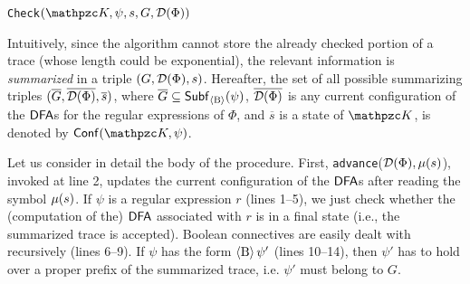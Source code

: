 \begin{algorithm}[tp]
    \caption{\texttt{Check}$(\Ku,\psi,s,G,\Du(\Phi))$}\label{Check}
    \begin{algorithmic}[1]
                \Return{$\top$}
            \Else
                \Return{$\bot$}
            \EndIf
                \Return{$\top$}
            \Else
                \Return{$\bot$}
            \EndIf
                    \Return{$\top$}
                \EndIf
            \EndFor
            \Return{$\bot$}
        \EndIf
    \end{algorithmic}
\end{algorithm}

Intuitively, since the algorithm cannot store the already checked portion of a
trace (whose length could be exponential), the relevant information is \emph{summarized} in a triple $(G,\mathcal{D}(\Phi),s)$. 
Hereafter, the set of all possible summarizing triples $(\overline{G},\overline{\mathcal{D}(\Phi)},\overline{s})$, where $\overline{G}\subseteq\mathsf{Subf}_{\operatorname{\langle B\rangle}}(\psi)$, $\overline{\mathcal{D}(\Phi)}$ is any current configuration of the $\text{\sffamily DFA}$s for the regular expressions of $\Phi$, and $\overline{s}$ is a state of $\Ku$, is denoted 
by $\conf(\Ku,\psi)$.

Let us consider in detail the body of the procedure.
First, \texttt{advance}($\mathcal{D}(\Phi),\mu(s)$), invoked at line 2, updates the current configuration of the $\text{\sffamily DFA}$s after reading the symbol $\mu(s)$. 
If $\psi$ is a regular expression $r$ (lines 1--5), we just check whether the (computation of the) $\text{\sffamily DFA}$ associated with $r$ is in a final state (i.e., the summarized trace is accepted).
Boolean connectives are easily dealt with recursively (lines 6--9).
If $\psi$ has the form $\operatorname{\langle B\rangle}\psi'$ (lines 10--14), then $\psi'$ has to hold over a proper prefix of the summarized trace, i.e. $\psi'$ must belong to $G$.

